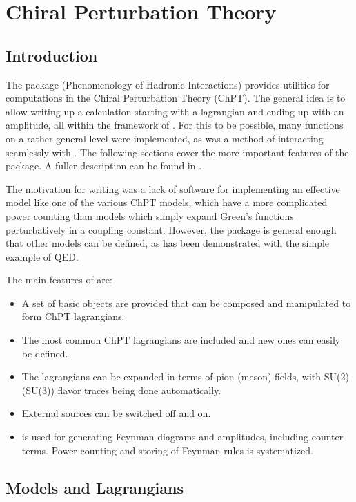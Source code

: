 \section{Chiral Perturbation Theory}

\subsection{Introduction}

The package \fphi (Phenomenology of Hadronic Interactions) provides utilities for computations in
the Chiral Perturbation Theory (ChPT).
The general idea is to allow writing up a calculation starting with a lagrangian and ending up
with an amplitude, all within the framework of \fc. For this to be possible, many functions on a
rather general level were implemented, as was a method of interacting seamlessly with \fa. The
following sections cover the more important features of the package. A fuller description can be
found in \cite{PHI}.

The motivation for writing \fphi was a lack of software for implementing an effective model like
one of the various ChPT models, which have a more complicated power counting than models which
simply expand Green's functions perturbatively in a coupling constant. However, the package is
general enough that other models can be defined, as has been demonstrated with the simple example
of QED.

The main features of \fphi are:
\begin{itemize}
\item A set of basic objects are provided that can be composed and manipulated to form ChPT
lagrangians.
\item The most common ChPT lagrangians are included and new ones can easily be defined.
\item The lagrangians can be expanded in terms of pion (meson) fields, with SU(2) (SU(3)) flavor
traces being done automatically.
\item External sources can be switched off and on.
\item \fa is used for generating Feynman diagrams and amplitudes, including counter-terms. Power
counting and storing of Feynman rules is systematized.
\end{itemize}

\subsection{Models and Lagrangians}

